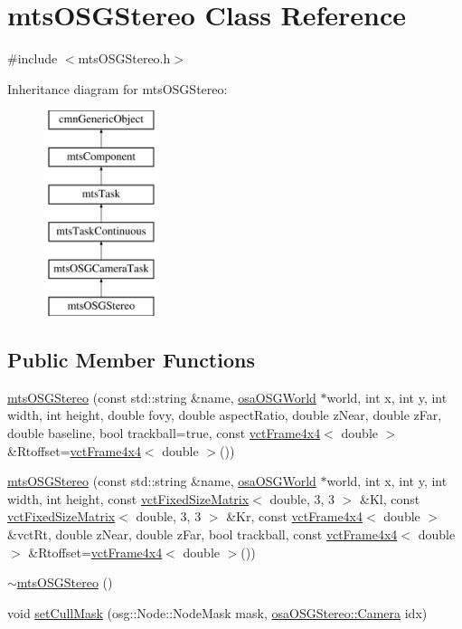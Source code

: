 \hypertarget{classmts_o_s_g_stereo}{\section{mts\-O\-S\-G\-Stereo Class Reference}
\label{classmts_o_s_g_stereo}
}


{\ttfamily \#include $<$mts\-O\-S\-G\-Stereo.\-h$>$}

Inheritance diagram for mts\-O\-S\-G\-Stereo\-:\begin{figure}[H]
\begin{center}
\leavevmode
\includegraphics[height=6.000000cm]{d2/daf/classmts_o_s_g_stereo}
\end{center}
\end{figure}
\subsection*{Public Member Functions}
\begin{DoxyCompactItemize}
\item 
\hyperlink{classmts_o_s_g_stereo_a87013e678b9113ab48c783e037c36050}{mts\-O\-S\-G\-Stereo} (const std\-::string \&name, \hyperlink{classosa_o_s_g_world}{osa\-O\-S\-G\-World} $\ast$world, int x, int y, int width, int height, double fovy, double aspect\-Ratio, double z\-Near, double z\-Far, double baseline, bool trackball=true, const \hyperlink{classvct_frame4x4}{vct\-Frame4x4}$<$ double $>$ \&Rtoffset=\hyperlink{classvct_frame4x4}{vct\-Frame4x4}$<$ double $>$())
\item 
\hyperlink{classmts_o_s_g_stereo_a9eaa1091a4aafdd0100a5b8b9c2891c5}{mts\-O\-S\-G\-Stereo} (const std\-::string \&name, \hyperlink{classosa_o_s_g_world}{osa\-O\-S\-G\-World} $\ast$world, int x, int y, int width, int height, const \hyperlink{classvct_fixed_size_matrix}{vct\-Fixed\-Size\-Matrix}$<$ double, 3, 3 $>$ \&Kl, const \hyperlink{classvct_fixed_size_matrix}{vct\-Fixed\-Size\-Matrix}$<$ double, 3, 3 $>$ \&Kr, const \hyperlink{classvct_frame4x4}{vct\-Frame4x4}$<$ double $>$ \&vct\-Rt, double z\-Near, double z\-Far, bool trackball, const \hyperlink{classvct_frame4x4}{vct\-Frame4x4}$<$ double $>$ \&Rtoffset=\hyperlink{classvct_frame4x4}{vct\-Frame4x4}$<$ double $>$())
\item 
\hyperlink{classmts_o_s_g_stereo_a271f81e88703fa48660c5d96a64c48c2}{$\sim$mts\-O\-S\-G\-Stereo} ()
\item 
void \hyperlink{classmts_o_s_g_stereo_a2c8d52e22a7f9f39303d899a9d2e1cc5}{set\-Cull\-Mask} (osg\-::\-Node\-::\-Node\-Mask mask, \hyperlink{classosa_o_s_g_stereo_a6f3072fa8cc1d46fcedff6b2d497f396}{osa\-O\-S\-G\-Stereo\-::\-Camera} idx)
\end{DoxyCompactItemize}
